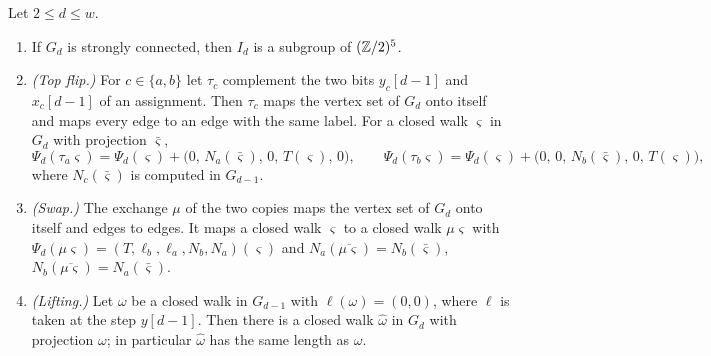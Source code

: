\begin{lemma}\label{pm:lem:theta}
Let $2\le d\le w$.
\begin{enumerate}
\item If $G_d$ is strongly connected, then $I_d$ is a subgroup of $(\mathbb{Z}/2)^5$.
\item \emph{(Top flip.)} For $c\in\{a,b\}$ let $\tau_c$ complement the two bits $y_c[d-1]$ and $x_c[d-1]$ of an assignment. Then $\tau_c$ maps the vertex set of $G_d$ onto itself and maps every edge to an edge with the same label. For a closed walk $\varsigma$ in $G_d$ with projection $\bar\varsigma$,
\[
\Psi_d(\tau_a\varsigma)=\Psi_d(\varsigma)+\bigl(0,\,N_a(\bar\varsigma),\,0,\,T(\varsigma),\,0\bigr),\qquad
\Psi_d(\tau_b\varsigma)=\Psi_d(\varsigma)+\bigl(0,\,0,\,N_b(\bar\varsigma),\,0,\,T(\varsigma)\bigr),
\]
where $N_c(\bar\varsigma)$ is computed in $G_{d-1}$.
\item \emph{(Swap.)} The exchange $\mu$ of the two copies maps the vertex set of $G_d$ onto itself and edges to edges. It maps a closed walk $\varsigma$ to a closed walk $\mu\varsigma$ with $\Psi_d(\mu\varsigma)=(T,\ell_b,\ell_a,N_b,N_a)(\varsigma)$ and $N_a(\overline{\mu\varsigma})=N_b(\bar\varsigma)$, $N_b(\overline{\mu\varsigma})=N_a(\bar\varsigma)$.
\item \emph{(Lifting.)} Let $\omega$ be a closed walk in $G_{d-1}$ with $\ell(\omega)=(0,0)$, where $\ell$ is taken at the step $y[d-1]$. Then there is a closed walk $\hat\omega$ in $G_d$ with projection $\omega$; in particular $\hat\omega$ has the same length as $\omega$.
\end{enumerate}
\end{lemma}

